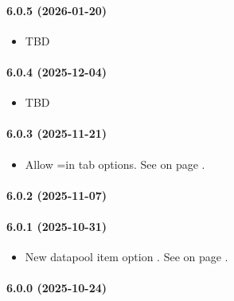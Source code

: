 \paragraph{6.0.5 (2026-01-20)}
\begin{itemize}
\item TBD
\end{itemize}

\paragraph{6.0.4 (2025-12-04)}
\begin{itemize}
\item TBD
\end{itemize}

\paragraph{6.0.3 (2025-11-21)}
\begin{itemize}
\item Allow \HIDDEN=\INTEGER in \FOLDER{} tab options.
      See  on page \pageref{dia:uifolderbuttonoptionlist}.
\end{itemize}

\paragraph{6.0.2 (2025-11-07)}

\paragraph{6.0.1 (2025-10-31)}
\begin{itemize}
\item New datapool item option \PROGRESS{}.
      See  on page \pageref{dia:dataitemoptions}.
\end{itemize}

\paragraph{6.0.0 (2025-10-24)}

